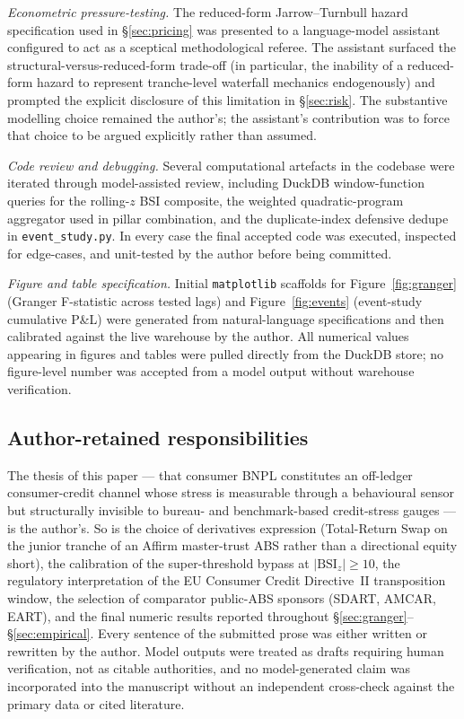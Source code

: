 \documentclass[11pt,letterpaper]{article}
\newcommand{\bsi}{\text{BSI}}
\begin{document}
\emph{Econometric pressure-testing.} The reduced-form
Jarrow--Turnbull hazard specification used in
\S\ref{sec:pricing} was presented to a language-model assistant
configured to act as a sceptical methodological referee. The
assistant surfaced the structural-versus-reduced-form trade-off
(in particular, the inability of a reduced-form hazard to
represent tranche-level waterfall mechanics endogenously) and
prompted the explicit disclosure of this limitation in
\S\ref{sec:risk}. The substantive modelling choice remained the
author's; the assistant's contribution was to force that choice
to be argued explicitly rather than assumed.

\emph{Code review and debugging.} Several computational artefacts
in the codebase were iterated through model-assisted review,
including DuckDB window-function queries for the rolling-$z$
BSI composite, the weighted quadratic-program aggregator used in
pillar combination, and the duplicate-index defensive dedupe in
\texttt{event\_study.py}. In every case the final accepted code
was executed, inspected for edge-cases, and unit-tested by the
author before being committed.

\emph{Figure and table specification.} Initial
\texttt{matplotlib} scaffolds for Figure~\ref{fig:granger}
(Granger F-statistic across tested lags) and
Figure~\ref{fig:events} (event-study cumulative P\&L) were
generated from natural-language specifications and then
calibrated against the live warehouse by the author. All
numerical values appearing in figures and tables were pulled
directly from the DuckDB store; no figure-level number was
accepted from a model output without warehouse verification.

\subsection{Author-retained responsibilities}
The thesis of this paper --- that consumer BNPL constitutes an
off-ledger consumer-credit channel whose stress is measurable
through a behavioural sensor but structurally invisible to
bureau- and benchmark-based credit-stress gauges --- is the
author's. So is the choice of derivatives expression
(Total-Return Swap on the junior tranche of an Affirm master-trust
ABS rather than a directional equity short), the calibration of
the super-threshold bypass at $|\bsi_z| \geq 10$, the regulatory
interpretation of the EU Consumer Credit Directive~II transposition
window, the selection of comparator public-ABS sponsors (SDART,
AMCAR, EART), and the final numeric results reported throughout
\S\ref{sec:granger}--\S\ref{sec:empirical}. Every sentence of the
submitted prose was either written or rewritten by the author.
Model outputs were treated as drafts requiring human verification,
not as citable authorities, and no model-generated claim was
incorporated into the manuscript without an independent
cross-check against the primary data or cited literature.
\end{document}
